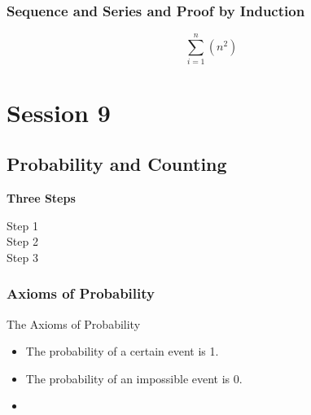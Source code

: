 \documentclass[]{report}
\begin{document}




\subsection{Sequence and Series and Proof by Induction}


\[\sum^{n}_{i=1} (n^2) \]








\newpage
\chapter{Session 9}
\section{Probability and Counting}
\newpage

\textbf{Three Steps}
\begin{description}
\item[Step 1]
\item[Step 2]
\item[Step 3]
\end{description}







\subsection{Axioms of Probability}

The Axioms of Probability

\begin{itemize}
\item The probability of a certain event is 1.
\item The probability of an impossible event is 0.
\item 
\end{itemize}
\end{document}
